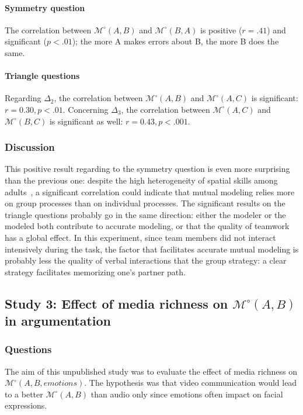 \documentclass[twocolumn]{article}
\newcommand{\Model}[3]{{$\mathcal{M}^{\circ}(#1, #2, #3)$}}
\newcommand{\gModel}[2]{{$\mathcal{M}^{\circ}(#1, #2)$}}
\begin{document}
\paragraph{Symmetry question} The correlation between \gModel{A}{B}  and
\gModel{B}{A}  is positive ($r = .41$) and significant ($p < .01$);  the more A
makes errors about B, the more B does the same.

\paragraph{Triangle questions} Regarding $\Delta_2$, the correlation between
\gModel{A}{B} and \gModel{A}{C} is significant: $r=0.30, p <.01$. Concerning
$\Delta_3$, the correlation between \gModel{A}{C} and \gModel{B}{C} is
significant as well: $r=0.43, p <.001$.

\subsubsection*{Discussion}

This positive result regarding to the symmetry question is even more surprising
than the previous one: despite the high heterogeneity of spatial skills among
adults~\citep{liben1981spatial}, a significant correlation could indicate that
mutual modeling relies more on group processes than on individual processes. The
significant results on the triangle questions probably go in the same direction:
either the modeler or the modeled both contribute to accurate modeling, or that
the quality of teamwork has a global effect. In this experiment, since team
members did not interact intensively during the task, the factor that
facilitates accurate mutual modeling is probably less the quality of verbal
interactions that the group strategy: a clear strategy facilitates memorizing
one's partner path. 




\subsection{Study 3:  Effect of media richness on \gModel{A}{B} in argumentation}

\subsubsection*{Questions}

The aim of this unpublished study was to evaluate the effect of media richness
on \Model{A}{B}{emotions}. The hypothesis was that video communication would
lead to a better \gModel{A}{B} than audio only since emotions often impact on
facial expressions.
\end{document}

